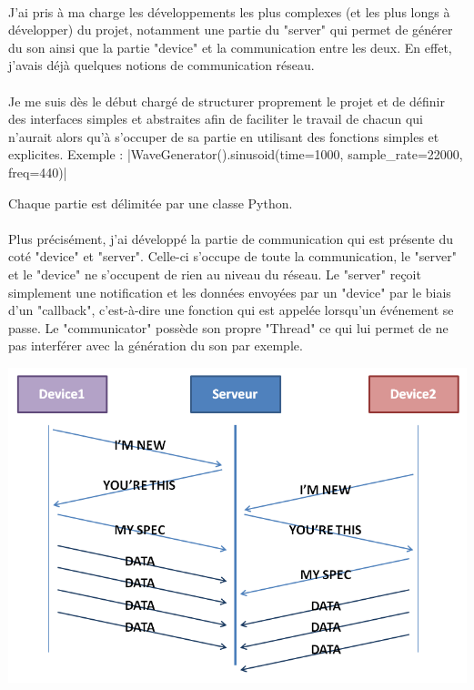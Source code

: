 \documentclass[12pt]{article}
\begin{document}
	\paragraph{}
	J’ai pris à ma charge les développements les plus complexes (et les plus longs à développer) du projet, notamment une partie du "server" qui permet de générer du son ainsi que la partie "device" et la communication entre les deux. En effet, j'avais déjà quelques notions de communication réseau.
	
	\paragraph{}
	Je me suis dès le début chargé de structurer proprement le projet et de définir des interfaces simples et abstraites afin de faciliter le travail de chacun qui n'aurait alors qu'à s'occuper de sa partie en utilisant des fonctions simples et explicites. Exemple :
	|WaveGenerator().sinusoid(time=1000, sample_rate=22000, freq=440)|
	
	Chaque partie est délimitée par une classe Python.
	
	\paragraph{}
	Plus précisément, j'ai développé la partie de communication qui est présente du coté "device" et "server". Celle-ci s'occupe de toute la communication, le "server" et le "device" ne s'occupent de rien au niveau du réseau. Le "server" reçoit simplement une notification et les données envoyées par un "device" par le biais d'un "callback", c'est-à-dire une fonction qui est appelée lorsqu'un événement se passe. Le "communicator" possède son propre "Thread" ce qui lui permet de ne pas interférer avec la génération du son par exemple.
	
	\noindent
	\includegraphics[width=\textwidth]{communication_example}
	
\end{document}
